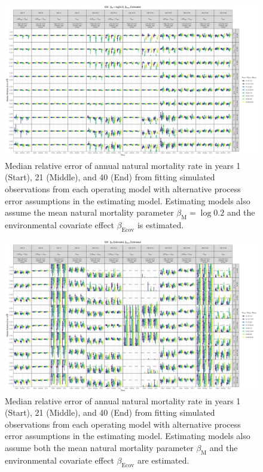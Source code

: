 \documentclass[
  12pt,
]{article}
\begin{document}
\begin{landscape}
\begin{figure}
\caption{Median relative error of annual natural mortality rate in years 1 (Start), 21 (Middle), and 40 (End) from fitting simulated observations from each operating model with alternative process error assumptions in the estimating model. Estimating models also assume the mean natural mortality parameter $\beta_\text{M} = \log 0.2$ and the environmental covariate effect $\beta_\text{Ecov}$ is estimated.}\label{annual_M_bias_M_fixed_beta_estimated}
\begin{center}
\includegraphics[height = \textheight]{annual_M_bias_all_PE_effect_M_fixed_beta_estimated.png}
\end{center}
\end{figure}
\end{landscape}

\begin{landscape}
\begin{figure}
\caption{Median relative error of annual natural mortality rate in years 1 (Start), 21 (Middle), and 40 (End) from fitting simulated observations from each operating model with alternative process error assumptions in the estimating model. Estimating models also assume both the mean natural mortality parameter $\beta_\text{M}$ and the environmental covariate effect $\beta_\text{Ecov}$ are estimated.}\label{annual_M_bias_M_estimated_beta_estimated}
\begin{center}
\includegraphics[height = \textheight]{annual_M_bias_all_PE_effect_M_estimated_beta_estimated.png}
\end{center}
\end{figure}
\end{landscape}
\end{document}

